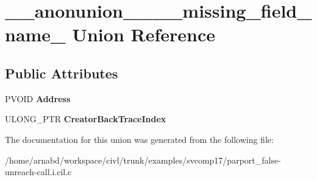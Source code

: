 \hypertarget{union____anonunion________missing__field__name__39}{}\section{\+\_\+\+\_\+anonunion\+\_\+\+\_\+\+\_\+\+\_\+missing\+\_\+field\+\_\+name\+\_ Union Reference}
\label{union____anonunion________missing__field__name__39}
\subsection*{Public Attributes}
\begin{DoxyCompactItemize}
\item 
\hypertarget{union____anonunion________missing__field__name__39_a53d5b9b057acdf1f95532605d4dbda34}{}P\+V\+O\+I\+D {\bfseries Address}\label{union____anonunion________missing__field__name__39_a53d5b9b057acdf1f95532605d4dbda34}

\item 
\hypertarget{union____anonunion________missing__field__name__39_adb8081d29d6fed4b28a2e9662a5f93be}{}U\+L\+O\+N\+G\+\_\+\+P\+T\+R {\bfseries Creator\+Back\+Trace\+Index}\label{union____anonunion________missing__field__name__39_adb8081d29d6fed4b28a2e9662a5f93be}

\end{DoxyCompactItemize}


The documentation for this union was generated from the following file\+:\begin{DoxyCompactItemize}
\item 
/home/arnabd/workspace/civl/trunk/examples/svcomp17/parport\+\_\+false-\/unreach-\/call.\+i.\+cil.\+c\end{DoxyCompactItemize}
